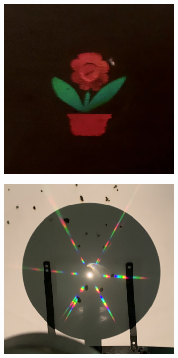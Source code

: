 \documentclass[a4paper]{article}
\begin{document}
\begin{figure}[H]
    \centering
    \begin{subfigure}[t]{0.3\textwidth}
        \centering
        \includegraphics[width=\textwidth]{phone-img/9.jpg}
        \caption{}
        \label{fig9-1}
    \end{subfigure}
    \begin{subfigure}[t]{0.3\textwidth}
        \centering
        \includegraphics[width=\textwidth]{phone-img/10.jpg}

\end{subfigure}
\end{figure}
\end{document}
